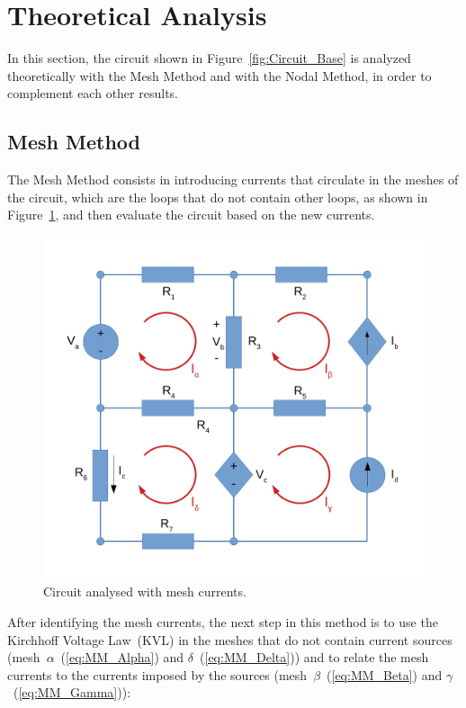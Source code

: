 \section{Theoretical Analysis}
\label{sec:analysis}

In this section, the circuit shown in Figure~\ref{fig:Circuit_Base} is analyzed theoretically with the Mesh Method and with the Nodal Method, in order to complement each other results.

\subsection{Mesh Method}


The Mesh Method consists in introducing currents that circulate in the meshes of the circuit, which are the loops that do not contain other loops, as shown in Figure~\ref{fig:Circuit_Mesh}, and then evaluate the circuit based on the new currents.


\begin{figure}[h] \centering
\includegraphics[width=0.5\linewidth]{CircuitMesh.pdf}
\caption{Circuit analysed with mesh currents.}
\label{fig:Circuit_Mesh}
\end{figure}

After identifying the mesh currents, the next step in this method is to use the Kirchhoff Voltage Law~(KVL) in the meshes that do not contain current sources (mesh~$\alpha$~(\ref{eq:MM_Alpha}) and $\delta$~(\ref{eq:MM_Delta})) and to relate the mesh currents to the currents imposed by the sources (mesh~$\beta$~(\ref{eq:MM_Beta}) and $\gamma$~(\ref{eq:MM_Gamma})):


